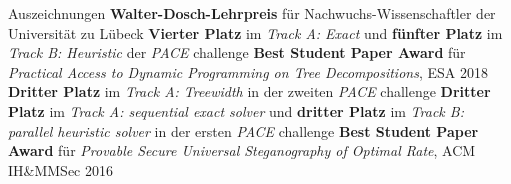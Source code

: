 \begin{rubric}{Auszeichnungen}
  \entry*[2022] \textbf{Walter-Dosch-Lehrpreis} für Nachwuchs-Wissenschaftler der Universität zu Lübeck
  \entry*[2020] \textbf{Vierter Platz} im \emph{Track A: Exact} und \textbf{fünfter Platz} im \emph{Track B: Heuristic} der \emph{PACE} challenge
\entry*[2018] \textbf{Best Student Paper Award} für \emph{Practical Access to Dynamic
Programming on Tree Decompositions}, ESA 2018
\entry*[2017] \textbf{Dritter Platz} im \emph{Track A: Treewidth} in der zweiten \emph{PACE}
challenge 
\entry*[2016] \textbf{Dritter Platz} im  \emph{Track A: sequential exact
solver} und \textbf{dritter Platz} im  \emph{Track B: parallel heuristic solver} in der ersten \emph{PACE}
challenge
\entry*[2016] \textbf{Best Student Paper Award} für \emph{Provable Secure Universal
Steganography of Optimal Rate}, ACM IH\&MMSec 2016
\end{rubric}
